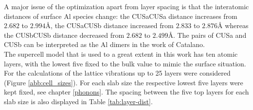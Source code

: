 \documentclass[11pt,DIV=13,BCOR=5mm,a4paper,headinclude]{scrbook}
\begin{document}
A major issue of the optimization apart from layer spacing is that the interatomic distances of surface Al species change: the CUSa\textendash CUSa distance increases from $2.682$ to $2.994$\AA{}, the CUSa\textendash CUSb distance increased from $2.833$ to $2.876$\AA{} whereas the CUSb\textendash CUSb distance decreased from $2.682$ to $2.499$\AA{}.
The pairs of CUSa and CUSb can be interpreted as the Al dimers in the work of Catalano\cite{catalano}.
\\
The supercell model that is used to a great extent in this work has ten atomic layers, with the lowest five fixed to the bulk value to mimic the surface situation.
For the calculations of the lattice vibrations up to 25 layers were considered (Figure \ref{abb:cell_sizes}).
For each slab size the respective lowest five layers were kept fixed, see chapter \ref{phonons}.
The spacing between the five top layers for each slab size is also displayed in Table \ref{tab:layer-dist}.
\end{document}
